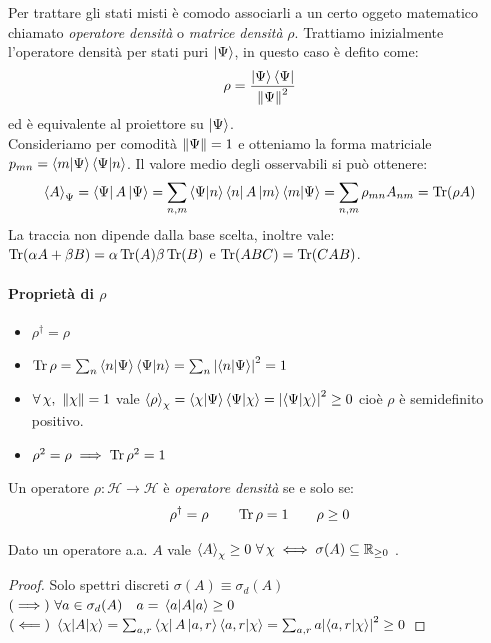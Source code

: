 Per trattare gli stati misti è comodo associarli a un certo oggeto matematico chiamato \textit{operatore densità} o \textit{matrice densità} \(\rho\).
Trattiamo inizialmente l'operatore densità per stati puri \(\ket{\Psi}\), in questo caso è defito come:
\begin{equation}
    \rho = \frac{\ket{\Psi}\bra{\Psi}}{\norm{\Psi}^2}
\end{equation}
ed è equivalente al proiettore su \(\ket{\Psi}\).\\ Consideriamo per comodità \(\norm{\Psi}= 1\) e otteniamo la forma matriciale \(p_{mn} = \braket{m}{\Psi}\braket{\Psi}{n}\). 
Il valore medio degli osservabili si può ottenere:
\begin{equation}
    \expval{A}_\Psi = \bra{\Psi}A\ket{\Psi}= \sum_{n,m} \braket{\Psi}{n}\bra{n}A\ket{m}\braket{m}{\Psi} = \sum_{n,m} \rho_{mn}A_{nm} = \Tr(\rho A)
\end{equation}
La traccia non dipende dalla base scelta, inoltre vale: \(\Tr(\alpha A + \beta B )= \alpha \Tr(A) \beta \Tr(B )\) e \(\Tr(ABC)= \Tr(CAB)\).

\paragraph{Proprietà di \(\rho\)}
\begin{itemize}
    \item \(\rho^\dagger = \rho\)
    \item \(\Tr \rho = \sum_n \braket{n}{\Psi}\braket{\Psi}{n}= \sum_n \abs{\braket{n}{\Psi}}^2 = 1\)
    \item \(\forall\,\chi ,\ \norm{\chi} = 1\) vale \(\expval{\rho}_\chi = \braket{\chi}{\Psi}\braket{\Psi}{\chi}= \abs{\braket{\Psi}{\chi}}^2 \geq 0\) cioè \(\rho\) è semidefinito positivo.
    \item \(\rho^2 = \rho \implies \Tr \rho^2 = 1\)
\end{itemize}

\begin{definition}
    Un operatore \(\rho : \mathcal{H}\to \mathcal{H}\) è \textit{operatore densità} se e solo se:
    \begin{equation}
        \rho^\dagger = \rho \qquad \Tr \rho = 1 \qquad \rho \geq 0
    \end{equation}
\end{definition}

\begin{remark}
    Dato un operatore a.a. \(A\) vale \(\expval{A}_\chi\geq 0 \ \forall \, \chi \iff \sigma(A) \subseteq \mathbb{R}_{\geq0}\) .
\end{remark}
\begin{proof} Solo spettri discreti \(\sigma(A)\equiv \sigma_d(A)\)\\
    \((\implies) \ \forall a \in \sigma_d(A) \quad a = \expval{A}{a}\geq 0\)\\
    \((\impliedby) \ \expval{A}{\chi} = \sum_{a,r}\bra{\chi}A\ket{a,r}\braket{a,r}{\chi}= \sum_{a,r}a \abs{\braket{a,r}{\chi}}^2\geq 0\)
\end{proof}

